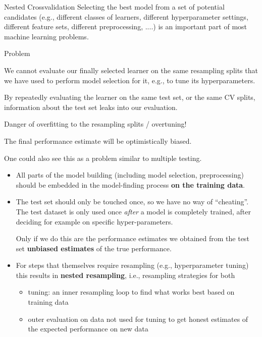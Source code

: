 \begin{frame}{Nested Crossvalidation}
Selecting the best model from a set of potential candidates (e.g., different classes of learners, different hyperparameter settings, different feature sets, different preprocessing, ....) is an important part of most  machine learning problems.

\begin{blocki}{Problem}
    \item We cannot evaluate our finally selected learner on the same resampling splits that we have used to perform model selection for it, e.g., to tune its hyperparameters.
    \item By repeatedly evaluating the learner on the same test set, or the same CV splits, information
      about the test set leaks into our evaluation.
    \item Danger of overfitting to the resampling splits / overtuning!
    \item The final performance estimate will be optimistically biased.
    \item One could also see this as a problem similar to multiple testing.
\end{blocki}

\framebreak

\begin{itemize}
\item All parts of the model building (including model selection, preprocessing) should be embedded in the model-finding process \textbf{on the training data}.
\item The test set should only be touched once, so we have no way of \enquote{cheating}. The test dataset is only used once \emph{after} a model is completely trained, after deciding for example on specific hyper-parameters.

Only if we do this are the performance estimates we obtained from the test set  \textbf{unbiased estimates} of the true performance.

\item For steps that themselves require resampling (e.g., hyperparameter tuning) this results
  in \textbf{nested resampling}, i.e., resampling strategies for both
  \begin{itemize}
  \item tuning: an inner resampling loop to find what works best based on training data
  \item outer evaluation on data not used for tuning to get honest estimates of the expected performance on new data
  \end{itemize}
\end{itemize}


\end{frame}
